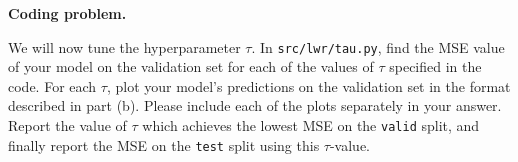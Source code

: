 \item {} \textbf{Coding problem.}

We will now tune the hyperparameter $\tau$.
In \texttt{src/lwr/tau.py}, find the MSE value of your model on the
validation set for each of the values of $\tau$ specified in the code. For each
$\tau$, plot your model's predictions on the validation set in the format
described in part (b). Please include each of the plots separately in your answer. Report the value of $\tau$ which achieves the lowest MSE
on the \texttt{valid} split, and finally report the MSE on the \texttt{test}
split using this $\tau$-value.
